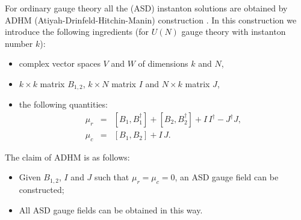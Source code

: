 \documentclass[a4paper,a4paper]{article}
\begin{document}
For ordinary gauge theory all the (ASD) instanton solutions are
obtained by ADHM (Atiyah-Drinfeld-Hitchin-Manin) construction
\cite{ADHM}. In this construction we introduce the following
ingredients (for $U(N)$ gauge theory with instanton number $k$):
\begin{itemize}
\item complex vector spaces $V$ and $W$ of dimensions $k$ and $N$,
\item $k\times k$ matrix $B_{1,2}$, $k\times N$ matrix $I$ and
$N\times k$ matrix $J$,
\item the following quantities:
\begin{eqnarray}
\label{ADHM1} \mu_r & = & [B_1, B_1^\dagger] + [B_2, B_2^\dagger]
+ I \,
I^\dagger -J^\dagger J, \\
\label{ADHM2} \mu_c & = & [B_1,B_2] + I\, J.
\end{eqnarray}
\end{itemize}
The claim of ADHM is as follows:
\begin{itemize}
\item Given $B_{1,2}$, $I$ and $J$ such that $\mu_r=\mu_c=0$, an
ASD gauge field can be constructed;
\item All ASD gauge fields can be obtained in this way.
\end{itemize}
\end{document}
